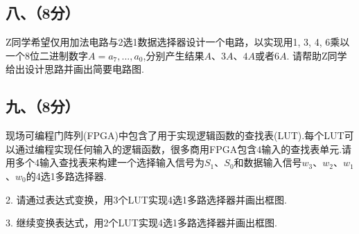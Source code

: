 \documentclass{ctexart}
\begin{document}
\subsection*{八、（8分）}
Z同学希望仅用加法电路与2选1数据选择器设计一个电路，以实现用1, 3, 4, 6乘以一个8位二进制数字$A=a_7,...,a_0$,分别产生结果$A$、$3A$、$4A$或者$6A$. 请帮助Z同学给出设计思路并画出简要电路图.

\newpage

\subsection*{九、（8分）}
现场可编程门阵列(FPGA)中包含了用于实现逻辑函数的查找表(LUT).每个LUT可以通过编程实现任何输入的逻辑函数，很多商用FPGA包含4输入的查找表单元.请用多个4输入查找表来构建一个选择输入信号为$S_1$、$S_0$和数据输入信号$w_3$、$w_2$、$w_1$、$w_0$的4选1多路选择器.\par
2.	请通过表达式变换，用3个LUT实现4选1多路选择器并画出框图.\par
3.	继续变换表达式，用2个LUT实现4选1多路选择器并画出框图.
\end{document}
